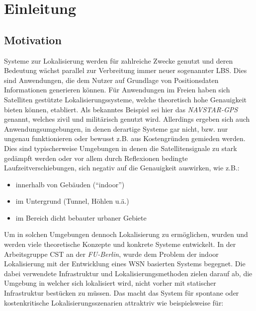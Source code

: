 \chapter{Einleitung}
\label{cha:einleitung}

\section{Motivation}
\label{sec:motivation}

Systeme zur Lokalisierung werden für zahlreiche Zwecke genutzt und deren
Bedeutung wächst parallel zur Verbreitung immer neuer sogenannter \gls{LBS}.
Dies sind Anwendungen, die dem Nutzer auf Grundlage von Positionsdaten
Informationen generieren können. Für Anwendungen im Freien haben sich
Satelliten gestützte Lokalisierungssysteme, welche theoretisch hohe Genauigkeit
bieten können, etabliert. Als bekanntes Beispiel sei hier das
\textit{NAVSTAR-GPS} genannt, welches zivil und militärisch genutzt wird.
Allerdings ergeben sich auch Anwendungsumgebungen, in denen derartige Systeme
gar nicht, bzw. nur ungenau funktionieren oder bewusst z.B. aus Kostengründen
gemieden werden. Dies sind typischerweise Umgebungen in denen die
Satellitensignale zu stark gedämpft werden oder vor allem durch Reflexionen
bedingte Laufzeitverschiebungen, sich negativ auf die Genauigkeit auswirken,
wie z.B.: 

\begin{itemize} 
  \item innerhalb von Gebäuden (``indoor'') 
  \item im Untergrund (Tunnel, Höhlen u.ä.) 
  \item im Bereich dicht bebauter urbaner Gebiete
\end{itemize}

Um in solchen Umgebungen dennoch Lokalisierung zu ermöglichen, wurden und werden
viele theoretische Konzepte und konkrete Systeme entwickelt. In der
Arbeitsgruppe \gls{CST} an der \textit{FU-Berlin}, wurde dem Problem der
indoor Lokalisierung mit der Entwicklung eines \gls{WSN} basierten Systems
begegnet. Die dabei verwendete Infrastruktur und Lokalisierungsmethoden zielen
darauf ab, die Umgebung in welcher sich lokalisiert wird, nicht vorher mit
statischer Infrastruktur bestücken zu müssen. Das macht das System für spontane
oder kostenkritische Lokalisierungsszenarien attraktriv wie beispielsweise für:

